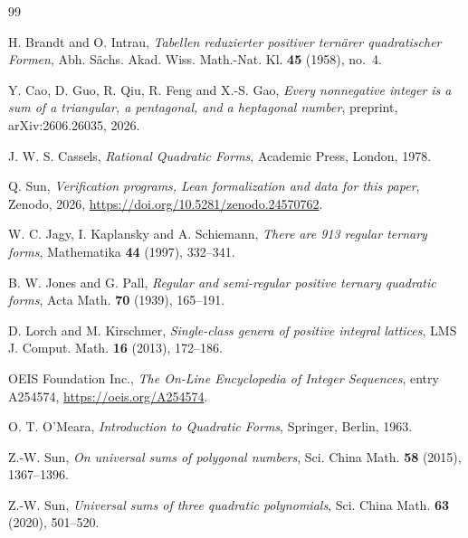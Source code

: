 \documentclass[11pt]{amsart}
\theoremstyle{definition}
\theoremstyle{remark}
\begin{document}
\begin{thebibliography}{99}

 H. Brandt and O. Intrau, \emph{Tabellen reduzierter positiver tern\"arer quadratischer Formen},
Abh. S\"achs. Akad. Wiss. Math.-Nat. Kl. \textbf{45} (1958), no.~4.

 Y. Cao, D. Guo, R. Qiu, R. Feng and X.-S. Gao, \emph{Every nonnegative integer is a sum of a triangular, a pentagonal, and a heptagonal number},
preprint, arXiv:2606.26035, 2026.

 J. W. S. Cassels, \emph{Rational Quadratic Forms}, Academic Press, London, 1978.

 Q. Sun, \emph{Verification programs, Lean formalization and data for this paper}, Zenodo, 2026, \url{https://doi.org/10.5281/zenodo.24570762}.

 W. C. Jagy, I. Kaplansky and A. Schiemann, \emph{There are 913 regular ternary forms}, Mathematika \textbf{44} (1997), 332--341.

 B. W. Jones and G. Pall, \emph{Regular and semi-regular positive ternary quadratic forms}, Acta Math. \textbf{70} (1939), 165--191.

 D. Lorch and M. Kirschmer, \emph{Single-class genera of positive integral lattices}, LMS J. Comput. Math. \textbf{16} (2013), 172--186.

 OEIS Foundation Inc., \emph{The On-Line Encyclopedia of Integer Sequences}, entry A254574, \url{https://oeis.org/A254574}.

 O. T. O'Meara, \emph{Introduction to Quadratic Forms}, Springer, Berlin, 1963.

 Z.-W. Sun, \emph{On universal sums of polygonal numbers}, Sci. China Math. \textbf{58} (2015), 1367--1396.

 Z.-W. Sun, \emph{Universal sums of three quadratic polynomials}, Sci. China Math. \textbf{63} (2020), 501--520.

\end{thebibliography}
\end{document}
